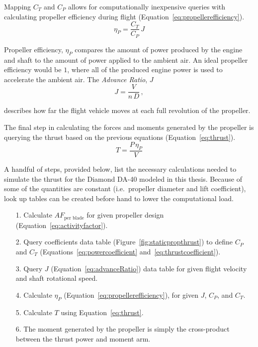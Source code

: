 Mapping \(C_T\) and \(C_P\) allows for computationally inexpensive queries with calculating propeller efficiency during flight (Equation~\ref{eq:propellerefficiency}).
\begin{equation}\label{eq:propellerefficiency}
    \eta_P = \frac{C_T}{C_P} \, J
\end{equation}

Propeller efficiency, \( \eta_P \) compares the amount of power produced by the engine and shaft to the amount of power applied to the ambient air. An ideal propeller efficiency would be \(1\), where all of the produced engine power is used to accelerate the ambient air. The \textit{Advance Ratio}, \(J\)
\begin{equation}\label{eq:advanceRatio}
    J = \frac{V}{n \, D} \, ,
\end{equation}

describes how far the flight vehicle moves at each full revolution of the propeller.

The final step in calculating the forces and moments generated by the propeller is querying the thrust based on the previous equations (Equation~\ref{eq:thrust}).
\begin{equation}\label{eq:thrust}
    T = \frac{P \, \eta_P}{V}
\end{equation}

A handful of steps, provided below, list the necessary calculations needed to simulate the thrust for the Diamond DA-40 modeled in this thesis. Because of some of the quantities are constant (i.e.\ propeller diameter and lift coefficient), look up tables can be created before hand to lower the computational load.

\begin{itemize}
    \item[1.] Calculate \(AF_{\textrm{per blade}}\) for given propeller design (Equation~\ref{eq:activityfactor}).
    \item[2.] Query coefficients data table (Figure~\ref{fig:staticpropthrust}) to define \(C_P\) and \(C_T\) (Equations~\ref{eq:powercoefficient} and~\ref{eq:thrustcoefficient}).
    \item[3.] Query \(J\) (Equation~\ref{eq:advanceRatio}) data table for given flight velocity and shaft rotational speed.
    \item[4.] Calculate \( \eta_P \) (Equation~\ref{eq:propellerefficiency}), for given \(J\), \(C_P\), and \(C_T\).
    \item[5.] Calculate \(T\) using Equation~\ref{eq:thrust}.
    \item[6.] The moment generated by the propeller is simply the cross-product between the thrust power and moment arm.
\end{itemize}

